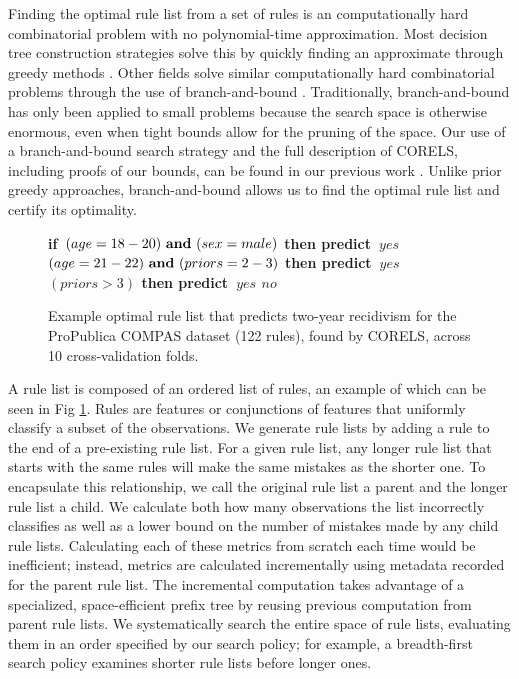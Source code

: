 \documentclass[format=sigconf]{acmart}
\def\bif{\bf if~}
\def\belif{{\bf else if~}}
\def\bthen{{\bf then predict~}}
\def\belse{{\bf else predict~}}
\def\band{{\bf ~and~}}
\begin{document}
Finding the optimal rule list from a set of rules is an computationally hard combinatorial problem with no polynomial-time approximation.
Most decision tree construction strategies solve this by quickly finding an approximate through greedy  methods \citep{BreimanFrOlSt84, Quinlan93}.
Other fields solve similar computationally hard combinatorial problems through the use of branch-and-bound \citep{Clausen99}.
Traditionally, branch-and-bound has only been applied to small problems because the search space is otherwise enormous, even when tight bounds allow for the pruning of the space.
Our use of a branch-and-bound search strategy and the full description of CORELS, including proofs of our bounds, can be found in our previous work \cite{AngelinoLaAlSeRu17, ErtekinRu17}.
Unlike prior greedy approaches, branch-and-bound allows us to find the optimal rule list and certify its optimality.

\begin{figure}[b!]
\vspace{-1mm}
\begin{algorithmic}
\State \bif $(age = 18-20) \band (sex = male)$ \bthen $yes$
\State \belif $(age = 21-22) \band (priors = 2-3)$ \bthen $yes$
\State \belif $(priors > 3)$ \bthen $yes$
\State \belse $no$
\end{algorithmic}
\vspace{-2mm}
\caption{Example optimal rule list that predicts two-year recidivism for the ProPublica COMPAS dataset (122 rules), found by CORELS, across 10 cross-validation folds.
%
}
\label{fig:recidivism}
\end{figure}

A rule list is composed of an ordered list of rules, an example of which can be seen in Fig \ref{fig:recidivism}.
Rules are features or conjunctions of features that uniformly classify a subset of the observations.
We generate rule lists by adding a rule to the end of a pre-existing rule list.
For a given rule list, any longer rule list that starts with the same rules will make the same mistakes as the shorter one.
To encapsulate this relationship, we call the original rule list a parent and the longer rule list a child.
We calculate both how many observations the list incorrectly classifies as well as a lower bound on the number of mistakes made by any child rule lists.
Calculating each of these metrics from scratch each time would be inefficient; instead, metrics are calculated incrementally using metadata recorded for the parent rule list.
The incremental computation takes advantage of a specialized, space-efficient prefix tree by reusing previous computation from parent rule lists.
We systematically search the entire space of rule lists, evaluating them in an order specified by our search policy; for example, a breadth-first search policy examines shorter rule lists before longer ones.
\end{document}

